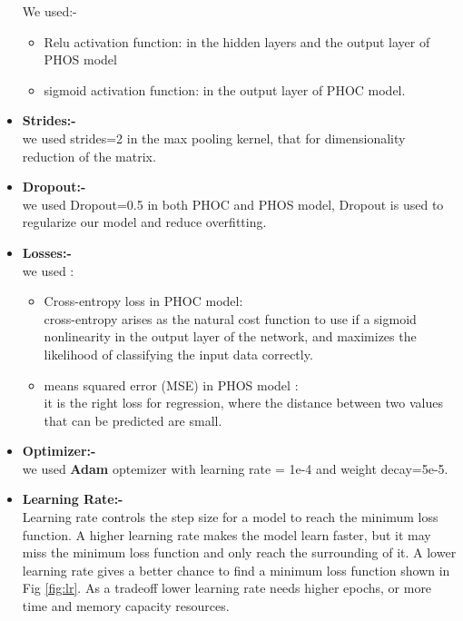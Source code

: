 \begin{itemize}[itemsep=1pt, topsep=5pt]
     We used:-
     \begin{itemize}[itemsep=1pt, topsep=5pt]
    \item Relu activation function:
    in the hidden layers and the output layer of PHOS model 
    \item sigmoid activation function:
    in the output layer of PHOC model.  
    \end{itemize} 
     \item \textbf{Strides:-}\\
     we used strides=2 in the max pooling kernel, that for dimensionality reduction of the matrix.
    
     \item \textbf{Dropout:-}\\
     we used  Dropout=0.5 in both PHOC and PHOS model,
      Dropout is used to regularize our model and reduce overfitting.
    \item \textbf{Losses:-}\\
     we used :
     \begin{itemize}[itemsep=1pt, topsep=5pt]
    \item Cross-entropy loss in PHOC model:\\
     cross-entropy arises as the natural cost function to use if a sigmoid  nonlinearity in the output layer of the network, and maximizes the likelihood of classifying the input data correctly.
    \item means squared error (MSE) in PHOS model :\\
    it is the right loss for regression, where the distance between two
values that can be predicted are small.
     \end{itemize} 
     \item \textbf{Optimizer:-}\\
     we used \textbf{Adam} optemizer with learning rate = 1e-4 and weight decay=5e-5.
     \item \textbf{Learning Rate:-}\\
     Learning rate controls the step size for a model to reach the minimum loss function. A higher learning rate makes the model learn faster, but it may miss the minimum loss function and only reach the surrounding of it. A lower learning rate gives a better chance to find a minimum loss function shown in Fig \ref{fig:lr}. As a tradeoff lower learning rate needs higher epochs, or more time and memory capacity resources.
     

\end{itemize}

